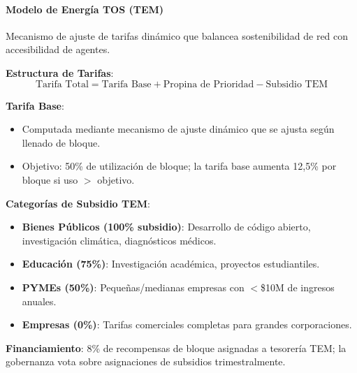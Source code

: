 \documentclass[11pt]{article}
\begin{document}
\paragraph{Modelo de Energía TOS (TEM)}
Mecanismo de ajuste de tarifas dinámico que balancea sostenibilidad de red con accesibilidad de agentes.

\textbf{Estructura de Tarifas}:
\begin{equation}
\text{Tarifa Total} = \text{Tarifa Base} + \text{Propina de Prioridad} - \text{Subsidio TEM}
\end{equation}

\textbf{Tarifa Base}:
\begin{itemize}[noitemsep]
  \item Computada mediante mecanismo de ajuste dinámico que se ajusta según llenado de bloque.
  \item Objetivo: 50\% de utilización de bloque; la tarifa base aumenta 12,5\% por bloque si uso $>$ objetivo.
\end{itemize}

\textbf{Categorías de Subsidio TEM}:
\begin{itemize}[noitemsep]
  \item \textbf{Bienes Públicos (100\% subsidio)}: Desarrollo de código abierto, investigación climática, diagnósticos médicos.
  \item \textbf{Educación (75\%)}: Investigación académica, proyectos estudiantiles.
  \item \textbf{PYMEs (50\%)}: Pequeñas/medianas empresas con $<$\$10M de ingresos anuales.
  \item \textbf{Empresas (0\%)}: Tarifas comerciales completas para grandes corporaciones.
\end{itemize}

\textbf{Financiamiento}: 8\% de recompensas de bloque asignadas a tesorería TEM; la gobernanza vota sobre asignaciones de subsidios trimestralmente.
\end{document}
